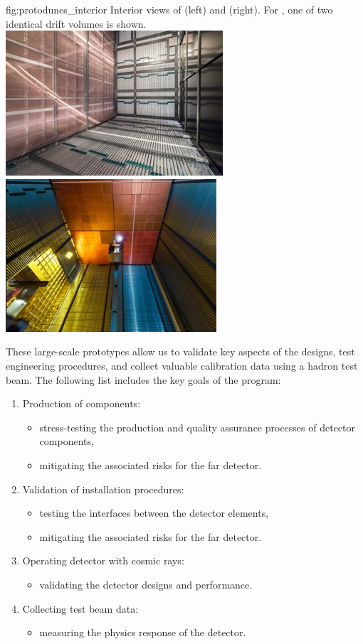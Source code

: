 \begin{dunefigure}
{fig:protodunes_interior}
{Interior views of  (left) and  (right). For , one of two identical drift volumes is shown.}
\includegraphics[width=0.46\linewidth]{graphics/ProtoDUNE-sp-interior.jpg}\hspace{0.05\linewidth}
\includegraphics[width=0.44\linewidth]{graphics/protodune-dp-interior.jpg}
\end{dunefigure}

These large-scale prototypes allow us to validate key aspects of the  designs, test engineering procedures, and collect valuable calibration data using a hadron test beam. The following list includes the key goals of the  program:
\begin{enumerate}
\item Production of components:
\begin{itemize}
\item stress-testing the production and quality
assurance processes of detector components,
\item mitigating the associated risks for the far detector.
\end{itemize}
\item Validation of installation procedures:
\begin{itemize}
\item testing the interfaces between the detector elements,
\item mitigating the associated risks for the far detector.
\end{itemize}
\item Operating detector with cosmic rays:
\begin{itemize}
\item validating the detector designs and
performance.
\end{itemize}
\item Collecting test beam data:
\begin{itemize}
\item measuring the physics response of the detector.
\end{itemize}
\end{enumerate}


